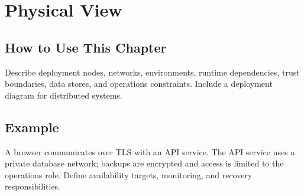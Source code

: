 \chapter{Physical View}
\section{How to Use This Chapter}
Describe deployment nodes, networks, environments, runtime dependencies, trust boundaries, data stores, and operations constraints. Include a deployment diagram for distributed systems.
\section{Example}
A browser communicates over TLS with an API service. The API service uses a private database network; backups are encrypted and access is limited to the operations role. Define availability targets, monitoring, and recovery responsibilities.
